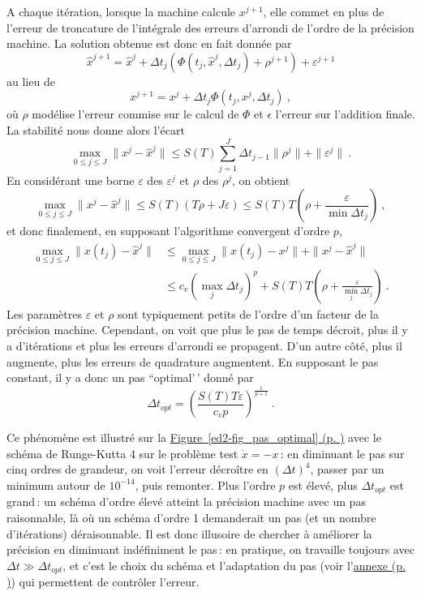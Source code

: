 A chaque itération, lorsque la machine calcule \(x^{j+1}\), elle commet
en plus de l'erreur de troncature de l'intégrale des erreurs d'arrondi
de l'ordre de la précision machine. La solution obtenue est donc en fait
donnée par \[
\hat{x}^{j+1} = \hat{x}^j + {\Delta t}_j \left( \Phi(t_j,\hat{x}^j,{\Delta t}_j) + \rho^{j+1} \right)+ \varepsilon^{j+1}
\] au lieu de \[
x^{j+1} = x^j + {\Delta t}_j \Phi(t_j,x^j,{\Delta t}_j) \ ,
\] où \(\rho\) modélise l'erreur commise sur le calcul de \(\Phi\) et
\(\epsilon\) l'erreur sur l'addition finale. La stabilité nous donne
alors l'écart \[
\max_{0\leq j \leq J} \|x^j-\hat{x}^j\| \leq S(T) \sum_{j=1}^J {\Delta t}_{j-1} \|\rho^{j}\| + \|\varepsilon^{j}\| \ .
\] En considérant une borne \(\varepsilon\) des \(\varepsilon^{j}\) et
\(\rho\) des \(\rho^{j}\), on obtient \[
\max_{0\leq j \leq J} \|x^j-\hat{x}^j\| \leq S(T) (T\rho + J \varepsilon) \leq S(T) T \left(\rho + \frac{\varepsilon}{\min {\Delta t}_j} \right) \ ,
\] et donc finalement, en supposant l'algorithme convergent d'ordre
\(p\), \begin{align*}
\max_{0\leq j \leq J} \|x(t_j)-\hat{x}^j\| &\leq \max_{0\leq j \leq J} \|x(t_j)-x^j\| + \|x^j - \hat{x}^j\| \\
&\leq c_v (\max_j {\Delta t}_j)^p +  S(T) T \left(\rho + \frac{\varepsilon}{\min_j {\Delta t}_j} \right) \ .
\end{align*} Les paramètres \(\varepsilon\) et \(\rho\) sont typiquement
petits de l'ordre d'un facteur de la précision machine. Cependant, on
voit que plus le pas de temps décroit, plus il y a d'itérations et plus
les erreurs d'arrondi se propagent. D'un autre côté, plus il augmente,
plus les erreurs de quadrature augmentent. En supposant le pas constant,
il y a donc un pas ``optimal'\,' donné par \[
{\Delta t}_{opt} = \left( \frac{S(T) T\varepsilon}{c_vp}\right)^{\frac{1}{p+1}} \ .
\]

Ce ph\'enom\`ene est illustr\'e sur la \protect\hyperlink{ed2-fig_pas_optimal}{Figure~\ref*{ed2-fig_pas_optimal} (p. \pageref*{ed2-fig_pas_optimal})} avec le sch\'ema de Runge-Kutta 4 sur le probl\`eme test \(\dot x = -x\)\,: en diminuant le pas sur cinq ordres de grandeur, on voit l'erreur d\'ecro\^itre en \(({\Delta t})^4\), passer par un minimum autour de \(10^{-14}\), puis remonter. Plus l'ordre \(p\) est \'elev\'e, plus \({\Delta t}_{opt}\) est grand\,: un sch\'ema d'ordre \'elev\'e atteint la pr\'ecision machine avec un pas raisonnable, l\`a o\`u un sch\'ema d'ordre 1 demanderait un pas (et un nombre d'it\'erations) d\'eraisonnable. Il est donc illusoire de chercher \`a am\'eliorer la pr\'ecision en diminuant ind\'efiniment le pas\,: en pratique, on travaille toujours avec \({\Delta t}\gg {\Delta t}_{opt}\), et c'est le choix du sch\'ema et l'adaptation du pas (voir l'\protect\hyperlink{ed2-annexe-choix-du-pas-de-temps}{annexe (p. \pageref*{ed2-annexe-choix-du-pas-de-temps})}) qui permettent de contr\^oler l'erreur.

